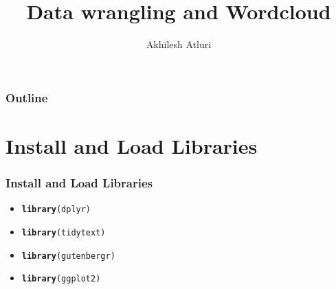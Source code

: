 \documentclass{beamer}\usepackage[]{graphicx}\usepackage[]{color}
\makeatletter
\newcommand{\hlstd}[1]{\textcolor[rgb]{0.345,0.345,0.345}{#1}}%
\newcommand{\hlkwd}[1]{\textcolor[rgb]{0.737,0.353,0.396}{\textbf{#1}}}%
\newenvironment{kframe}{%
 \def\at@end@of@kframe{}%
 \ifinner\ifhmode%
  \def\at@end@of@kframe{\end{minipage}}%
  \begin{minipage}{\columnwidth}%
 \fi\fi%
 \def\FrameCommand##1{\hskip\@totalleftmargin \hskip-\fboxsep
 \colorbox{shadecolor}{##1}\hskip-\fboxsep
     \hskip-\linewidth \hskip-\@totalleftmargin \hskip\columnwidth}%
 \MakeFramed {\advance\hsize-\width
   \@totalleftmargin\z@ \linewidth\hsize
   \@setminipage}}%
 {\par\unskip\endMakeFramed%
 \at@end@of@kframe}
\newenvironment{knitrout}{}{} %
\makeatother
\begin{document}
\title{Data wrangling and Wordcloud}
\author{Akhilesh Atluri}

\begin{frame}
  \titlepage
\end{frame}

\begin{frame}
  \frametitle{Outline}
    \tableofcontents
\end{frame}

\section{Install and Load Libraries}
\begin{frame}[fragile]
  \frametitle{Install and Load Libraries}
    \begin{itemize}
      \item<1->
\begin{knitrout}
\color{fgcolor}\begin{kframe}
\begin{alltt}
\hlkwd{library}\hlstd{(dplyr)}
\end{alltt}
\end{kframe}
\end{knitrout}
      \item<2->
\begin{knitrout}
\color{fgcolor}\begin{kframe}
\begin{alltt}
\hlkwd{library}\hlstd{(tidytext)}
\end{alltt}
\end{kframe}
\end{knitrout}
    \item<3->
\begin{knitrout}
\color{fgcolor}\begin{kframe}
\begin{alltt}
\hlkwd{library}\hlstd{(gutenbergr)}
\end{alltt}
\end{kframe}
\end{knitrout}
    \item<4->
\begin{knitrout}
\color{fgcolor}\begin{kframe}
\begin{alltt}
\hlkwd{library}\hlstd{(ggplot2)}
\end{alltt}

\end{kframe}
\end{knitrout}
\end{itemize}
\end{frame}
\end{document}
